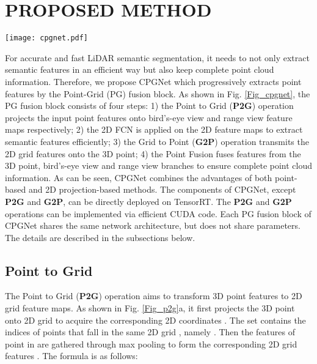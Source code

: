 \documentclass[letterpaper, 10 pt, conference]{ieeeconf}
\begin{document}
\section{PROPOSED METHOD}

\begin{figure*}[t]
\centering
\texttt{[image: cpgnet.pdf]}
\caption{The Point-Grid (PG) fusion block. It takes the point features from the last PG fusion block as input and undergoes the point, bird’s-eye view and range view branches, respectively. The output point features are acquired by fusing features from the three branches.}
\label{Fig_cpgnet}
\end{figure*}

For accurate and fast LiDAR semantic segmentation, it needs to not only extract semantic features in an efficient way but also keep complete point cloud information. Therefore, we propose CPGNet which progressively extracts point features by the Point-Grid (PG) fusion block. As shown in Fig. \ref{Fig_cpgnet}, the PG fusion block consists of four steps: 1) the Point to Grid ({\bf P2G}) operation projects the input point features onto bird’s-eye view and range view feature maps respectively; 2) the 2D FCN is applied on the 2D feature maps to extract semantic features efficiently; 3) the Grid to Point ({\bf G2P}) operation transmits the 2D grid features onto the 3D point; 4) the Point Fusion fuses features from the 3D point, bird’s-eye view and range view branches to ensure complete point cloud information. As can be seen, CPGNet combines the advantages of both point-based and 2D projection-based methods. The components of CPGNet, except {\bf P2G} and {\bf G2P}, can be directly deployed on TensorRT. The {\bf P2G} and {\bf G2P} operations can be implemented via efficient CUDA code. Each PG fusion block of CPGNet shares the same network architecture, but does not share parameters. The details are described in the subsections below.

\subsection{Point to Grid}
The Point to Grid ({\bf P2G}) operation aims to transform 3D point features to 2D grid feature maps. As shown in Fig. \ref{Fig_p2g}a, it first projects the  3D point  onto 2D grid to acquire the corresponding 2D coordinates . The set  contains the indices of points that fall in the same 2D grid , namely . Then the features  of point in  are gathered through max pooling to form the corresponding 2D grid features . The formula is as follows:
\end{document}
